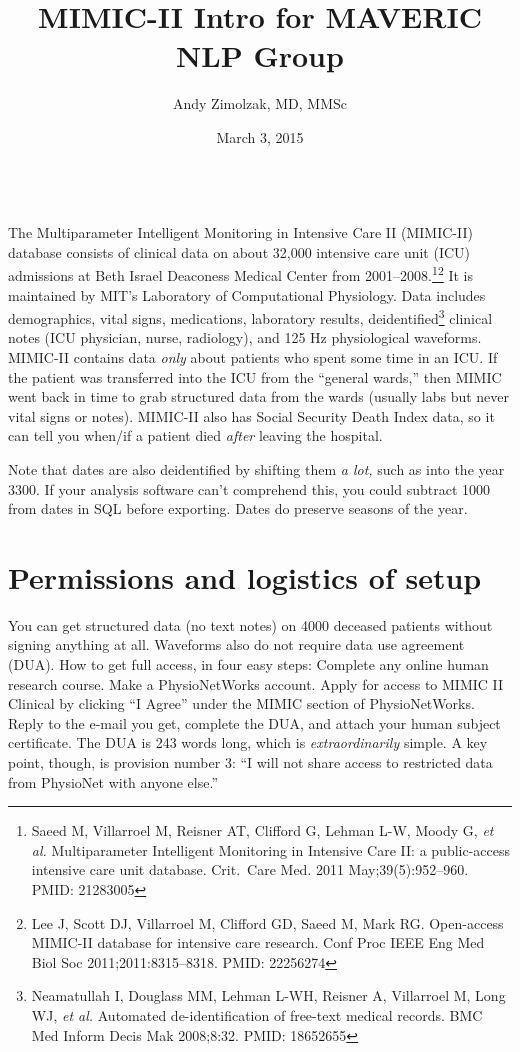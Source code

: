 \documentclass{tufte-handout}
\title{MIMIC-II Intro for MAVERIC NLP Group}
\author{Andy Zimolzak, MD, MMSc}
\date{March 3, 2015}
\begin{document}
\maketitle

~\\

The Multiparameter Intelligent Monitoring in Intensive Care II
(MIMIC-II) database consists of clinical data on about 32,000
intensive care unit (ICU) admissions at Beth Israel Deaconess Medical
Center from 2001--2008.\footnote{Saeed M, Villarroel M, Reisner AT,
  Clifford G, Lehman L-W, Moody G, \emph{et al.} Multiparameter
  Intelligent Monitoring in Intensive Care II: a public-access
  intensive care unit database. Crit.\ Care Med. 2011
  May;39(5):952–960. PMID: 21283005}\footnote{Lee J, Scott DJ,
  Villarroel M, Clifford GD, Saeed M, Mark RG. Open-access MIMIC-II
  database for intensive care research. Conf Proc IEEE Eng Med Biol
  Soc 2011;2011:8315–8318. PMID: 22256274} It is maintained by MIT's
Laboratory of Computational Physiology. Data includes demographics,
vital signs, medications, laboratory results,
deidentified\footnote{Neamatullah I, Douglass MM, Lehman L-WH, Reisner
  A, Villarroel M, Long WJ, \emph{et al.} Automated de-identification
  of free-text medical records. BMC Med Inform Decis Mak 2008;8:32.
  PMID: 18652655 } clinical notes (ICU physician, nurse, radiology),
and 125 Hz physiological waveforms. MIMIC-II contains data \emph{only}
about patients who spent some time in an ICU. If the patient was
transferred into the ICU from the ``general wards,'' then MIMIC went
back in time to grab structured data from the wards (usually labs but
never vital signs or notes). MIMIC-II also has Social Security Death
Index data, so it can tell you when/if a patient died \emph{after}
leaving the hospital.

Note that dates are also deidentified by shifting them \emph{a lot,}
such as into the year 3300. If your analysis software can't comprehend
this, you could subtract 1000 from dates in SQL before exporting.
Dates do preserve seasons of the year. 


\section{Permissions and logistics of setup}

You can get structured data (no text notes) on 4000 deceased patients
without signing anything at all. Waveforms also do not require data
use agreement (DUA). How to get full access, in four easy steps:
Complete any online human research course. Make a PhysioNetWorks
account. Apply for access to MIMIC II Clinical by clicking ``I Agree''
under the MIMIC section of PhysioNetWorks. Reply to the e-mail you
get, complete the DUA, and attach your human subject certificate. The
DUA is 243 words long, which is \emph{extraordinarily} simple. A key
point, though, is provision number 3: ``I will not share access to
restricted data from PhysioNet with anyone else.''
\end{document}
